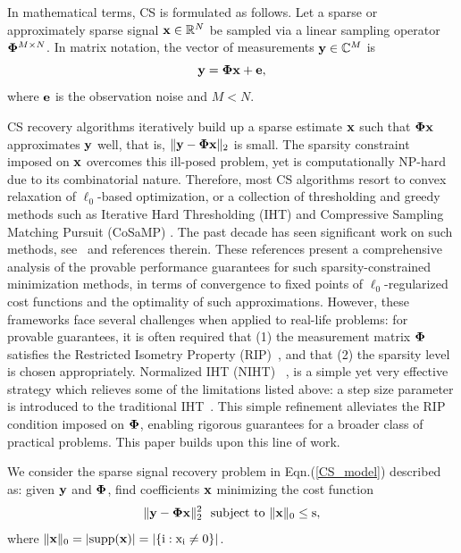 \documentclass{article}
\begin{document}
In mathematical terms, CS is formulated as follows. Let a sparse or approximately sparse signal ${\bf x}\in \mathbb{R}^N$ be sampled via a linear sampling operator ${\bf \Phi}^{M\times N}$. In matrix notation, the vector of measurements ${\bf y} \in \mathbb{C}^M$ is
\vspace{-.3em}
\begin{equation}\label{CS_model}
 {\bf y} =  {\bf \Phi}  {\bf x} + {\bf e},
\end{equation}
where ${\bf e}$ is the observation noise and $M < N$.

CS recovery algorithms iteratively build up a sparse estimate ${\bf x}$ such that ${\bf \Phi}  {\bf x}$ approximates ${\bf y}$ well, that is,  $\| {\bf y}- {\bf \Phi}  {\bf x} \|_2$ is small. The sparsity constraint imposed on ${\bf x}$ overcomes this ill-posed problem, yet is computationally NP-hard due to its combinatorial nature. 
Therefore, most CS algorithms resort to convex relaxation of $\ell_0$-based optimization, or a collection of thresholding and greedy methods such as Iterative Hard Thresholding (IHT) \cite{blumensath2008iht, blumensath2009iht} and Compressive Sampling Matching Pursuit (CoSaMP) \cite{needel2008cosamp}. The past decade has seen significant work on such methods, see~\cite{liu2017dualiht, yuan2014ht, yuan2016htp, blumensath2013cs, needel2008cosamp} and references therein. These references present a comprehensive analysis of the provable performance guarantees for such sparsity-constrained minimization methods, in terms of convergence to fixed points of $\ell_0$-regularized cost functions and the optimality of such approximations. However, these frameworks face several challenges when applied to real-life problems: for provable guarantees, it is often required that (1) the measurement matrix ${\bf \Phi}$ satisfies the Restricted Isometry Property (RIP)~\cite{candes2008rip, chartrand2008rip}, and that (2) the sparsity level is chosen appropriately. 
Normalized IHT (NIHT)~ \cite{blumensath2010niht}, is a simple yet very effective strategy  which relieves some of the limitations listed above: a step size parameter is introduced to the traditional IHT~\cite{blumensath2008iht}. This simple refinement alleviates the RIP condition imposed on ${\bf \Phi}$, enabling rigorous guarantees for a broader class of practical problems. {This paper
builds upon this line of work.}


 We consider the sparse signal recovery problem in Eqn.(\ref{CS_model}) described as: given ${\bf y}$ and ${\bf \Phi}$, find coefficients ${\bf x}$ minimizing the cost function
 \begin{equation}\label{cost_function}
     \|{\bf y} - {\bf \Phi x} \|_2^2 \ \ \rm{subject \ to \ \|{\bf x} \|_0 \leq s},
 \end{equation}
 where $\|{\bf x} \|_0 = |\rm{supp}({\bf x})| = |\{i: x_i\neq 0 \}|$.
 
\end{document}
